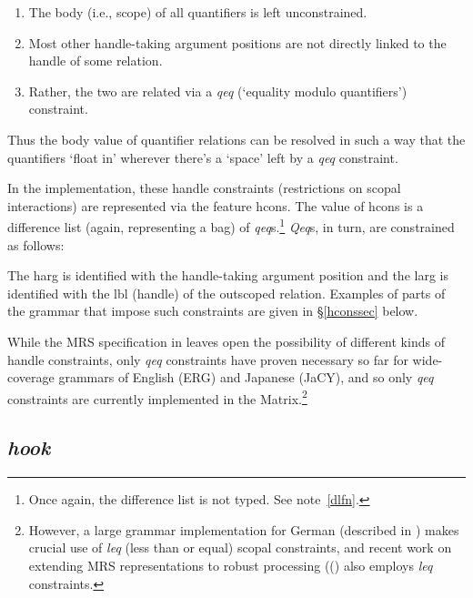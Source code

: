 \documentclass[12pt]{article}
\newcommand{\es}{\enumsentence}
\newcommand{\fn}{\footnote}
\begin{document}
\begin{enumerate}
\item The {\sc body} (i.e., scope) of all quantifiers is left unconstrained.
\item Most other handle-taking argument positions are not directly linked 
to the handle of some relation.
\item Rather, the two are related via a {\it qeq} (`equality modulo 
quantifiers') constraint.
\end{enumerate}

\noindent
Thus the {\sc body} value of quantifier relations can be resolved in
such a way that the quantifiers `float in' wherever there's a `space'
left by a {\it qeq} constraint.

In the implementation, these handle constraints (restrictions on scopal
interactions) are represented via the feature {\sc
hcons}.  The value of {\sc hcons} is a difference list (again,
representing a bag) of {\it qeq}s.\fn{Once again, the difference list
is not typed.  See note~\ref{dlfn}.}  {\it Qeq}s, in turn, are
constrained as follows:

\es{
\begin{avm}
{\it qeq}: \[ harg & handle\\
	      larg & handle \]
\end{avm}
}

\noindent
The {\sc harg} is identified with the handle-taking argument position
and the {\sc larg} is identified with the {\sc lbl} (handle) of the outscoped
relation.  Examples of parts of the grammar that impose such constraints
are given in \S\ref{hconssec} below.

While the MRS specification in  leaves
open the possibility of different kinds of handle constraints, only
{\it qeq} constraints have proven necessary so far for wide-coverage
grammars of English (ERG) and Japanese (JaCY), and so only
{\it qeq} constraints are currently implemented in the 
Matrix.\footnote{However, a large grammar implementation for German 
(described in )
makes crucial use of {\it leq} (less than or equal) scopal
constraints, and recent work on extending MRS representations to robust 
processing ((\cite{Cop:03}) also employs {\it leq} constraints.}

\subsection{{\it hook}}
\label{hooksec}
\end{document}
